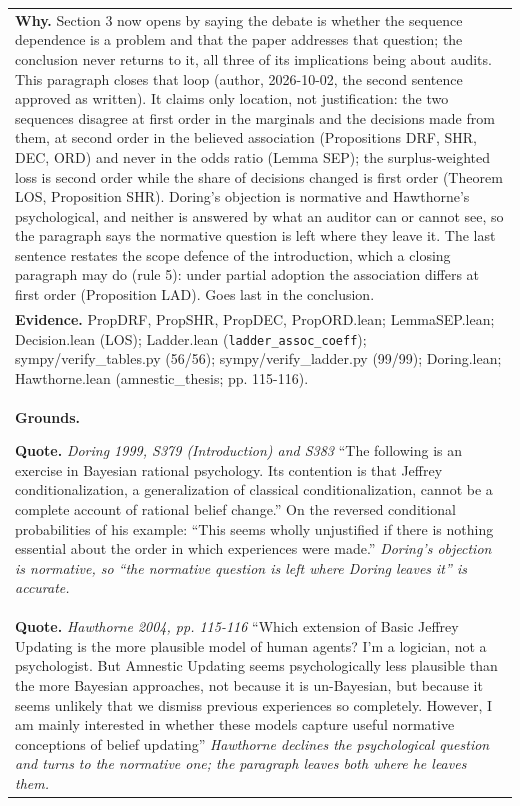 \documentclass[10pt]{article}
\theoremstyle{definition}
\newlength{\fullw}\setlength{\fullw}{25.9cm}
\begin{document}
{\begin{longtable}{|p{0.9cm}|p{12.2cm}|p{12.2cm}|}
\multicolumn{3}{|p{\fullw}|}{\textbf{Why.} Section 3 now opens by saying the debate is whether the sequence dependence is a problem and that the paper addresses that question; the conclusion never returns to it, all three of its implications being about audits. This paragraph closes that loop (author, 2026-10-02, the second sentence approved as written). It claims only location, not justification: the two sequences disagree at first order in the marginals and the decisions made from them, at second order in the believed association (Propositions DRF, SHR, DEC, ORD) and never in the odds ratio (Lemma SEP); the surplus-weighted loss is second order while the share of decisions changed is first order (Theorem LOS, Proposition SHR). Doring's objection is normative and Hawthorne's psychological, and neither is answered by what an auditor can or cannot see, so the paragraph says the normative question is left where they leave it. The last sentence restates the scope defence of the introduction, which a closing paragraph may do (rule 5): under partial adoption the association differs at first order (Proposition LAD). Goes last in the conclusion.} \\
\multicolumn{3}{|p{\fullw}|}{\textbf{Evidence.} PropDRF, PropSHR, PropDEC, PropORD.lean; LemmaSEP.lean; Decision.lean (LOS); Ladder.lean (\texttt{ladder\_assoc\_coeff}); sympy/verify\_tables.py (56/56); sympy/verify\_ladder.py (99/99); Doring.lean; Hawthorne.lean (amnestic\_thesis; pp. 115-116).} \\ \hline
\multicolumn{3}{|p{\fullw}|}{\textbf{Grounds.}\par \textbf{Quote.} \textit{Doring 1999, S379 (Introduction) and S383} \newline ``The following is an exercise in Bayesian rational psychology. Its contention is that Jeffrey conditionalization, a generalization of classical conditionalization, cannot be a complete account of rational belief change.'' On the reversed conditional probabilities of his example: ``This seems wholly unjustified if there is nothing essential about the order in which experiences were made.'' \newline \textit{Doring's objection is normative, so ``the normative question is left where Doring leaves it'' is accurate.}} \\
\multicolumn{3}{|p{\fullw}|}{\textbf{Quote.} \textit{Hawthorne 2004, pp. 115-116} \newline ``Which extension of Basic Jeffrey Updating is the more plausible model of human agents? I'm a logician, not a psychologist. But Amnestic Updating seems psychologically less plausible than the more Bayesian approaches, not because it is un-Bayesian, but because it seems unlikely that we dismiss previous experiences so completely. However, I am mainly interested in whether these models capture useful normative conceptions of belief updating'' \newline \textit{Hawthorne declines the psychological question and turns to the normative one; the paragraph leaves both where he leaves them.}} \\

\end{longtable}}
\end{document}

